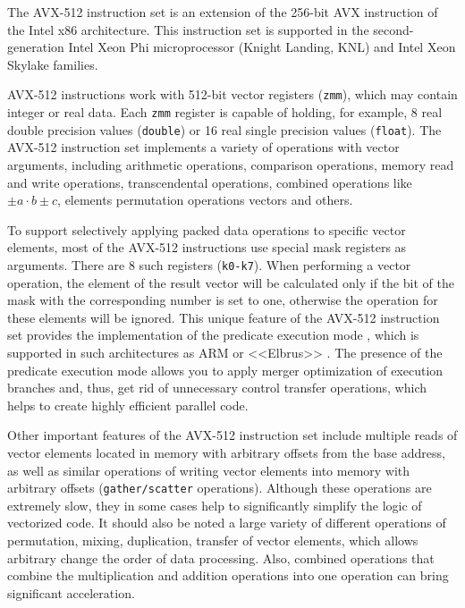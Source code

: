 \documentclass[utf8,english]{psta}%
\begin{document}
The AVX-512 instruction set is an extension of the 256-bit AVX instruction of the Intel x86 architecture.
This instruction set is supported in the second-generation Intel Xeon Phi microprocessor (Knight Landing, KNL) and Intel Xeon Skylake families.

AVX-512 instructions work with 512-bit vector registers (\texttt{zmm}), which may contain integer or real data.
Each \texttt{zmm} register is capable of holding, for example, 8 real double precision values (\texttt{double}) or 16 real single precision values (\texttt{float}).
The AVX-512 instruction set implements a variety of operations with vector arguments, including arithmetic operations, comparison operations, memory read and write operations, transcendental operations, combined operations like $\pm a \cdot b \pm c$, elements permutation operations vectors and others.

To support selectively applying packed data operations to specific vector elements, most of the AVX-512 instructions use special mask registers as arguments.
There are 8 such registers (\texttt{k0-k7}).
When performing a vector operation, the element of the result vector will be calculated only if the bit of the mask with the corresponding number is set to one, otherwise the operation for these elements will be ignored.
This unique feature of the AVX-512 instruction set provides the implementation of the predicate execution mode \cite{VolOkuPred}, which is supported in such architectures as ARM or <<Elbrus>> \cite{KimElbrus}.
The presence of the predicate execution mode allows you to apply merger optimization of execution branches and, thus, get rid of unnecessary control transfer operations, which helps to create highly efficient parallel code.

Other important features of the AVX-512 instruction set include multiple reads of vector elements located in memory with arbitrary offsets from the base address, as well as similar operations of writing vector elements into memory with arbitrary offsets (\texttt{gather/scatter} operations).
Although these operations are extremely slow, they in some cases help to significantly simplify the logic of vectorized code.
It should also be noted a large variety of different operations of permutation, mixing, duplication, transfer of vector elements, which allows arbitrary change the order of data processing.
Also, combined operations that combine the multiplication and addition operations into one operation can bring significant acceleration.
\end{document}
